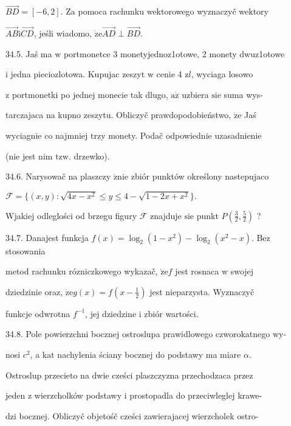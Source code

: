 \documentclass[a4paper,12pt]{article}
\begin{document}
$\vec{BD}=[-6,2]$. Za pomoca rachunku wektorowego wyznaczyč wektory

$\vec{AB}\mathrm{i}\vec{CD}$, jeśli wiadomo, $\dot{\mathrm{z}}\mathrm{e} \vec{AD}\perp\vec{BD}.$

34.5. Jaś ma $\mathrm{w}$ portmonetce 3 monetyjednoz1otowe, 2 monety dwuz1otowe

$\mathrm{i}$ jedna pieciozlotowa. Kupujac zeszyt $\mathrm{w}$ cenie 4 $\mathrm{z}l$, wyciaga losowo

$\mathrm{z}$ portmonetki po jednej monecie tak dlugo, $\mathrm{a}\dot{\mathrm{z}}$ uzbiera $\mathrm{s}\mathrm{i}\mathrm{e}$ suma wys-

tarczajaca na kupno zeszytu. Obliczyč prawdopodobieństwo, $\dot{\mathrm{z}}\mathrm{e}$ Jaś

wyciagnie co najmniej trzy monety. Podač odpowiednie uzasadnienie

(nie jest nim $\mathrm{t}\mathrm{z}\mathrm{w}$. drzewko).

34.6. Narysowač na plaszczy $\acute{\mathrm{z}}\mathrm{n}\mathrm{i}\mathrm{e}$ zbiór punktów określony nastepujaco

$\mathcal{F}=\{(x,y):\sqrt{4x-x^{2}}\leq y\leq 4-\sqrt{1-2x+x^{2}}\}.$

Wjakiej odleglości od brzegu figury $\mathcal{F}$ znajduje $\mathrm{s}\mathrm{i}\mathrm{e}$ punkt $P(\displaystyle \frac{3}{2},\frac{5}{2})$ ?

34.7. Danajest funkcja $f(x)=\log_{2}(1-x^{2})-\log_{2}(x^{2}-x)$. Bez stosowania

metod rachunku rózniczkowego wykazač, $\dot{\mathrm{z}}\mathrm{e}f$ jest rosnaca $\mathrm{w}$ swojej

dziedzinie oraz, $\dot{\mathrm{z}}\mathrm{e}g(x) = f(x-\displaystyle \frac{1}{2})$ jest nieparzysta. Wyznaczyč

funkcje odwrotna $f^{-1}$, jej dziedzine $\mathrm{i}$ zbiór wartości.

34.8. Pole powierzchni bocznej ostroslupa prawidlowego czworokatnego wy-

nosi $c^{2}$, a $\mathrm{k}\mathrm{a}\mathrm{t}$ nachylenia ściany bocznej do podstawy ma miare $\alpha.$

Ostroslup przecieto na dwie cześci plaszczyzna przechodzaca przez

jeden $\mathrm{z}$ wierzcholków podstawy $\mathrm{i}$ prostopadla do przeciwleglej krawe-

dzi bocznej. Obliczyč objetośč cześci zawierajacej wierzcholek ostro-
\end{document}
